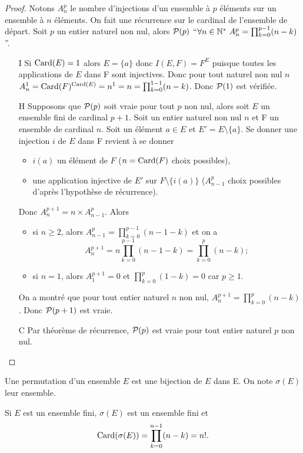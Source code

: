 \begin{proof}
  Notons $A_n^p$ le nombre d'injections d'un ensemble à $p$ éléments sur un ensemble à $n$ éléments. On fait une récurrence sur le cardinal de l'ensemble de départ. Soit $p$ un entier naturel non nul, alors $\P(p)$ ``$\forall n \in \N^* \ A_n^p=\prod_{k=0}^{p-1}(n-k)$''. 
  \begin{itemize}
  \item[I] Si $\Card(E)=1$ alors $E=\{a\}$ donc $I(E,F)=F^E$ puisque toutes les applications de $E$ dans F sont injectives. Donc pour tout naturel non nul $n$ $A_n^1=\Card(F)^{\Card(E)}=n^1=n=\prod_{k=0}^{1-1}(n-k)$. Donc $\P(1)$ est vérifiée.
  \item[H] Supposons que $\P(p)$ soit vraie pour tout $p$ non nul, alors soit $E$ un ensemble fini de cardinal $p+1$. Soit un entier naturel non nul $n$ et F un ensemble de cardinal $n$. Soit un élément $a\in E$ et $E'=E\setminus\{a\}$. Se donner une injection $i$ de $E$ dans F revient à se donner
    \begin{itemize}
    \item $i(a)$ un élément de $F$ ($n=\Card(F)$ choix possibles),
    \item une application injective de $E'$ sur $F\setminus\{i(a)\}$ ($A_{n-1}^p$ choix possibles d'après l'hypothèse de récurrence).
    \end{itemize}
    Donc $A_{n}^{p+1}=n \times A_{n-1}^p$. Alors 
    \begin{itemize}
    \item si $n\geqslant 2$, alors  $A_{n-1}^p=\prod_{k=0}^{p-1}(n-1-k)$ et on a
      \begin{equation}
        A_{n}^{p+1}=n\prod_{k=0}^{p-1}(n-1-k)=\prod_{k=0}^{p}(n-k);
      \end{equation}
    \item si $n=1$, alors $A_{1}^{p+1}=0$ et $\prod_{k=0}^{p}(1-k)=0$ car $p\geqslant 1$.
    \end{itemize}
    On a montré que pour tout entier naturel $n$ non nul, $A_{n}^{p+1}=\prod_{k=0}^{p}(n-k)$. Donc $\P(p+1)$ est vraie.
  \item[C] Par théorème de récurrence, $\P(p)$ est vraie pour tout entier naturel $p$ non nul.
  \end{itemize}
\end{proof}
\begin{defdef}
  Une permutation d'un ensemble $E$ est une bijection de $E$ dans E. On note $\sigma(E)$ leur ensemble.
\end{defdef}
\begin{prop}
  Si $E$ est un ensemble fini, $\sigma(E)$ est un ensemble fini et
  \begin{equation}
    \Card(\sigma(E))=\prod_{k=0}^{n-1}(n-k)=n!.
  \end{equation}
\end{prop}
